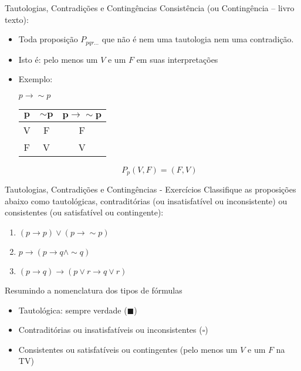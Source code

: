 \begin{frame}[t]{Tautologias, Contradições e Contingências} %
	Consistência (ou Contingência -- livro texto):
	\begin{itemize}
	\item Toda proposição $P_{pqr\ldots}$ que não é nem uma tautologia nem uma contradição.
	\item Isto é: pelo menos um $V$ e um $F$ em suas interpretações
	\item Exemplo: \begin{center}$p \rightarrow \sim p$ \end{center}

	\vskip 1cm
	
	\begin{center}
	\begin{tabular}{|c|c|c|}
	\hline
	$\mathbf{p}$ & $\mathbf{\sim p}$ & $\mathbf{p \rightarrow \sim p}$ \\
	\hline
	V & F & F \\
	\hline
	F & V & V \\
	\hline
	\end{tabular}
	\end{center}
	$$P_p(V, F) = (F, V)$$
	\end{itemize}
\end{frame}

\begin{frame}[t]{Tautologias, Contradições e Contingências - Exercícios} %
	Classifique as proposições abaixo como tautológicas, contraditórias (ou insatisfatível ou inconsistente) ou consistentes (ou satisfatível ou contingente):
	\begin{enumerate}
	\item $(p \rightarrow p) \vee (p \rightarrow\sim p)$
	\item $p \rightarrow (p \rightarrow q \wedge\sim q)$
	\item $(p \rightarrow q) \rightarrow (p \vee r \rightarrow q \vee r)$
	\end{enumerate}
\end{frame}
\begin{frame}[t]{Resumindo a nomenclatura dos tipos de fórmulas} %

\begin{block} {}
	\begin{itemize}
	\item Tautológica: sempre verdade ($\blacksquare $)
	\item Contraditórias ou insatisfatíveis ou inconsistentes ($\square$)
	\item Consistentes ou satisfatíveis ou contingentes (pelo menos um $V$ e um $F$ na TV)
	\end{itemize}
\end{block}	
\end{frame}

